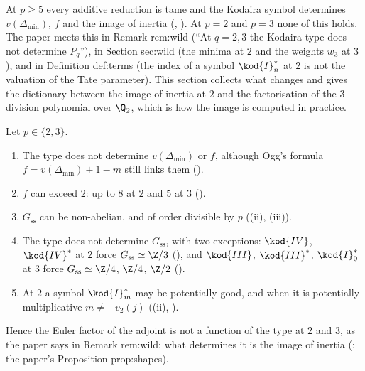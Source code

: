 At $p\ge5$ every additive reduction is tame and the Kodaira symbol determines $v(\Delta_{\min})$, $f$ and the image of inertia
(, ). At $p=2$ and $p=3$ none of this holds. The paper meets this in Remark
rem:wild (``At $q=2,3$ the Kodaira type does not determine $P_q$''), in Section sec:wild (the minima at $2$ and the weights $w_3$
at $3$), and in Definition def:terms (the index of a symbol $\kod{I}_n^*$ at $2$ is not the valuation of the Tate parameter). This
section collects what changes and gives the dictionary between the image of inertia at $2$ and the factorisation of the
$3$-division polynomial over $\Q_2$, which is how the image is computed in practice.

\begin{remark}\label{rem:reduction:wild-overview}
Let $p\in\{2,3\}$.
\begin{enumerate}[label=(\roman*)]
\item The type does not determine $v(\Delta_{\min})$ or $f$, although Ogg's formula $f=v(\Delta_{\min})+1-m$ still links them
().
\item $f$ can exceed $2$: up to $8$ at $2$ and $5$ at $3$ ().
\item $G_{\mathrm{ss}}$ can be non-abelian, and of order divisible by $p$ ((ii), (iii)).
\item The type does not determine $G_{\mathrm{ss}}$, with two exceptions: $\kod{IV}$, $\kod{IV}^*$ at $2$ force $G_{\mathrm{ss}}\simeq\Z/3$
(), and $\kod{III}$, $\kod{III}^*$, $\kod{I}_0^*$ at $3$ force $G_{\mathrm{ss}}\simeq\Z/4$, $\Z/4$, $\Z/2$
().
\item At $2$ a symbol $\kod{I}_m^*$ may be potentially good, and when it is potentially multiplicative $m\ne-v_2(j)$
((ii), ).
\end{enumerate}
Hence the Euler factor of the adjoint is not a function of the type at $2$ and $3$, as the paper says in Remark rem:wild; what
determines it is the image of inertia (; the paper's Proposition prop:shapes).
\end{remark}

